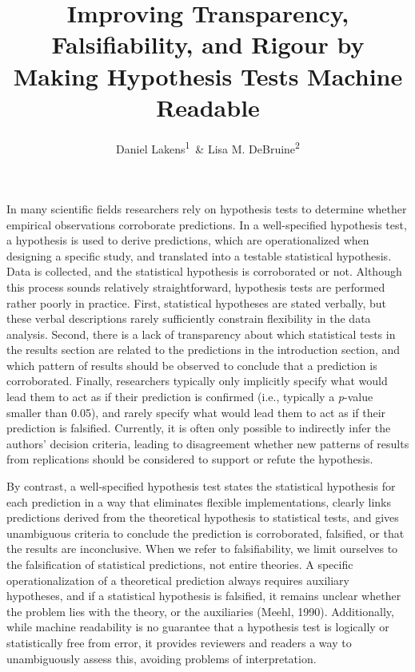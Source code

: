 \documentclass[
  english,
  doc,floatsintext]{apa6}
\author{Daniel Lakens\textsuperscript{1}\ \& Lisa M. DeBruine\textsuperscript{2}}
\affiliation{
\vspace{0.5cm}
\textsuperscript{1} School of Innovation Sciences, Eindhoven University of Technology\\\textsuperscript{2} Institute of Neuroscience and Psychology, University of Glasgow}
\title{Improving Transparency, Falsifiability, and Rigour by Making Hypothesis Tests Machine Readable}
\date{}
\begin{document}
\maketitle

In many scientific fields researchers rely on hypothesis tests to determine whether empirical observations corroborate predictions. In a well-specified hypothesis test, a hypothesis is used to derive predictions, which are operationalized when designing a specific study, and translated into a testable statistical hypothesis. Data is collected, and the statistical hypothesis is corroborated or not. Although this process sounds relatively straightforward, hypothesis tests are performed rather poorly in practice. First, statistical hypotheses are stated verbally, but these verbal descriptions rarely sufficiently constrain flexibility in the data analysis. Second, there is a lack of transparency about which statistical tests in the results section are related to the predictions in the introduction section, and which pattern of results should be observed to conclude that a prediction is corroborated. Finally, researchers typically only implicitly specify what would lead them to act as if their prediction is confirmed (i.e., typically a \emph{p}-value smaller than 0.05), and rarely specify what would lead them to act as if their prediction is falsified. Currently, it is often only possible to indirectly infer the authors' decision criteria, leading to disagreement whether new patterns of results from replications should be considered to support or refute the hypothesis.

By contrast, a well-specified hypothesis test states the statistical hypothesis for each prediction in a way that eliminates flexible implementations, clearly links predictions derived from the theoretical hypothesis to statistical tests, and gives unambiguous criteria to conclude the prediction is corroborated, falsified, or that the results are inconclusive. When we refer to falsifiability, we limit ourselves to the falsification of statistical predictions, not entire theories. A specific operationalization of a theoretical prediction always requires auxiliary hypotheses, and if a statistical hypothesis is falsified, it remains unclear whether the problem lies with the theory, or the auxiliaries (Meehl, 1990). Additionally, while machine readability is no guarantee that a hypothesis test is logically or statistically free from error, it provides reviewers and readers a way to unambiguously assess this, avoiding problems of interpretation.
\end{document}
